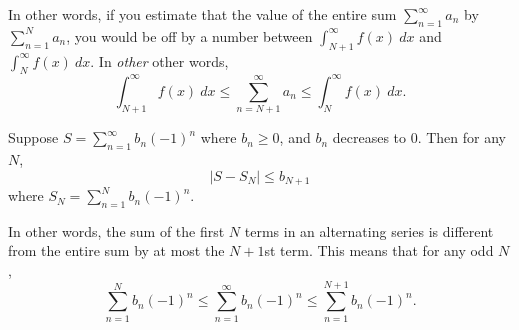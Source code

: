 In other words, if you estimate that the value of the entire sum $\sum_{n=1}^\infty a_n$ by $\sum_{n=1}^N a_n$, you would be off by a number between $\int_{N+1}^\infty f(x)\ dx$ and $\int_{N}^\infty f(x)\ dx$. In \textit{other} other words,
$$\int_{N+1}^\infty f(x)\ dx \leq \sum_{n=N+1}^\infty a_n \leq  \int_{N}^\infty f(x)\ dx.$$

\begin{thm}

Suppose $S=\sum_{n=1}^\infty b_n (-1)^n$ where $b_n\geq 0$, and $b_n$ decreases to 0. Then for any $N$,
$$\left|S-S_N\right|\leq b_{N+1}$$
where $S_N=\sum_{n=1}^N b_n (-1)^n$.
\end{thm}
In other words, the sum of the first $N$ terms in an alternating series is different from the entire sum by at most the $N+1$st term. This means that for any odd $N$,
$$\sum_{n=1}^N b_n (-1)^n\leq\sum_{n=1}^\infty b_n (-1)^n\leq\sum_{n=1}^{N+1} b_n (-1)^n.$$

